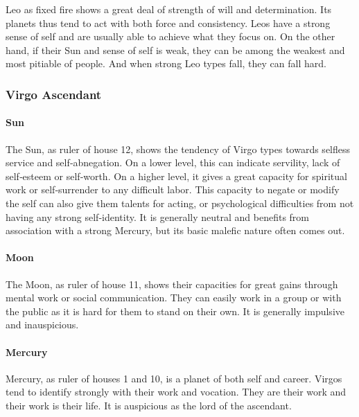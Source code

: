  

Leo as fixed fire shows a great deal of strength of will and determination. Its planets thus tend to act with both force and consistency. Leos have a strong sense of self and are usually able to achieve what they focus on. On the other hand, if their Sun and sense of self is weak, they can be among the weakest and most pitiable of people. And when strong Leo types fall, they can fall hard.

 

\subsubsection{Virgo Ascendant}
 

\paragraph{Sun}

The Sun, as ruler of house 12, shows the tendency of Virgo types towards selfless service and self‑abnegation. On a lower level, this can indicate servility, lack of self‑esteem or self‑worth. On a higher level, it gives a great capacity for spiritual work or self‑surrender to any difficult labor. This capacity to negate or modify the self can also give them talents for acting, or psychological difficulties from not having any strong self‑identity. It is generally neutral and benefits from association with a strong Mercury, but its basic malefic nature often comes out.

 

\paragraph{Moon}

The Moon, as ruler of house 11, shows their capacities for great gains through mental work or social communication. They can easily work in a group or with the public as it is hard for them to stand on their own. It is generally impulsive and inauspicious.

 

\paragraph{Mercury}

Mercury, as ruler of houses 1 and 10, is a planet of both self and career. Virgos tend to identify strongly with their work and vocation. They are their work and their work is their life. It is auspicious as the lord of the ascendant.

